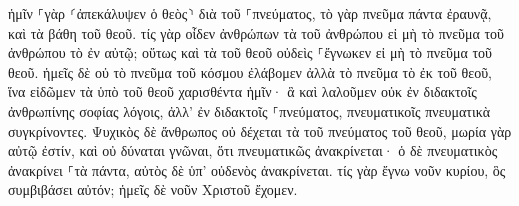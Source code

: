 \documentclass{openreader}
\begin{document}
ἡμῖν ⸀γὰρ ⸂ἀπεκάλυψεν ὁ θεὸς⸃ διὰ τοῦ ⸀πνεύματος, τὸ γὰρ πνεῦμα πάντα ἐραυνᾷ, καὶ τὰ βάθη τοῦ θεοῦ. 
τίς γὰρ οἶδεν ἀνθρώπων τὰ τοῦ ἀνθρώπου εἰ μὴ τὸ πνεῦμα τοῦ ἀνθρώπου τὸ ἐν αὐτῷ; οὕτως καὶ τὰ τοῦ θεοῦ οὐδεὶς ⸀ἔγνωκεν εἰ μὴ τὸ πνεῦμα τοῦ θεοῦ. 
ἡμεῖς δὲ οὐ τὸ πνεῦμα τοῦ κόσμου ἐλάβομεν ἀλλὰ τὸ πνεῦμα τὸ ἐκ τοῦ θεοῦ, ἵνα εἰδῶμεν τὰ ὑπὸ τοῦ θεοῦ χαρισθέντα ἡμῖν· 
ἃ καὶ λαλοῦμεν οὐκ ἐν διδακτοῖς ἀνθρωπίνης σοφίας λόγοις, ἀλλ’ ἐν διδακτοῖς ⸀πνεύματος, πνευματικοῖς πνευματικὰ συγκρίνοντες. 
Ψυχικὸς δὲ ἄνθρωπος οὐ δέχεται τὰ τοῦ πνεύματος τοῦ θεοῦ, μωρία γὰρ αὐτῷ ἐστίν, καὶ οὐ δύναται γνῶναι, ὅτι πνευματικῶς ἀνακρίνεται· 
ὁ δὲ πνευματικὸς ἀνακρίνει ⸀τὰ πάντα, αὐτὸς δὲ ὑπ’ οὐδενὸς ἀνακρίνεται. 
τίς γὰρ ἔγνω νοῦν κυρίου, ὃς συμβιβάσει αὐτόν; ἡμεῖς δὲ νοῦν Χριστοῦ ἔχομεν. 
\end{document}
